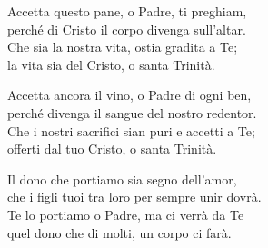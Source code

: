 
\strofa Accetta questo pane, o Padre, ti preghiam,\\
perché di Cristo il corpo divenga sull'altar.\\
Che sia la nostra vita, ostia gradita a Te;\\
la vita sia del Cristo, o santa Trinità.

\spazio

\strofa Accetta ancora il vino, o Padre di ogni ben,\\
perché divenga il sangue del nostro redentor.\\
Che i nostri sacrifici sian puri e accetti a Te;\\
offerti dal tuo Cristo, o santa Trinità.

\spazio

\strofa Il dono che portiamo sia segno dell'amor,\\
che i figli tuoi tra loro per sempre unir dovrà.\\
Te lo portiamo o Padre, ma ci verrà da Te\\
quel dono che di molti, un corpo ci farà.